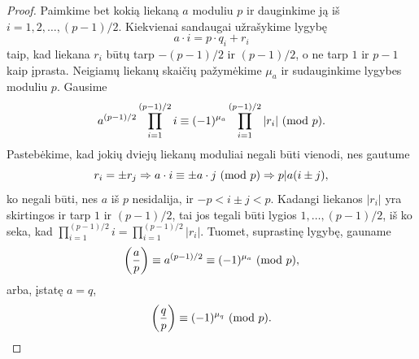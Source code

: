 \begin{proof}
Paimkime bet kokią liekaną $a$ moduliu $p$ ir dauginkime ją iš $i= 1, 2,
\dots, (p-1)/2$.  Kiekvienai sandaugai užrašykime lygybę
$$a\cdot i = p\cdot q_i + r_i$$
taip, kad liekana $r_i$ būtų tarp $-(p-1)/2$ ir $(p-1)/2$, o ne tarp $1$ ir
$p-1$ kaip įprasta. Neigiamų liekanų skaičių pažymėkime $\mu_a$ ir
sudauginkime lygybes moduliu $p$. Gausime
$$a^{(p-1)/2}\prod_{i=1}^{(p-1)/2}i \equiv (-1)^{\mu_a}
\prod_{i=1}^{(p-1)/2}|r_i|\ (\text{mod } p).$$
Pastebėkime, kad jokių dviejų liekanų moduliai negali būti vienodi, nes
gautume $$r_i = \pm r_j \Rightarrow a\cdot i \equiv \pm a\cdot j \ (\text{mod } p)
\Rightarrow p|a(i\pm j),$$ ko negali būti, nes $a$ iš $p$ nesidalija, ir
$-p<i\pm j<p$. Kadangi liekanos $|r_i|$ yra skirtingos ir tarp $1$ ir
$(p-1)/2$, tai jos tegali būti lygios $1, \dots, (p-1)/2$, iš ko seka, kad
$\prod_{i=1}^{(p-1)/2}i = \prod_{i=1}^{(p-1)/2}|r_i|$. Tuomet, suprastinę
lygybę, gauname 
$$\left(\frac{a}{p}\right) \equiv a^{(p-1)/2} \equiv (-1)^{\mu_a} \ (\text{mod } p),$$
arba, įstatę $a=q$,
$$\left(\frac{q}{p}\right) \equiv (-1)^{\mu_q}\ (\text{mod } p).$$


\end{proof}
